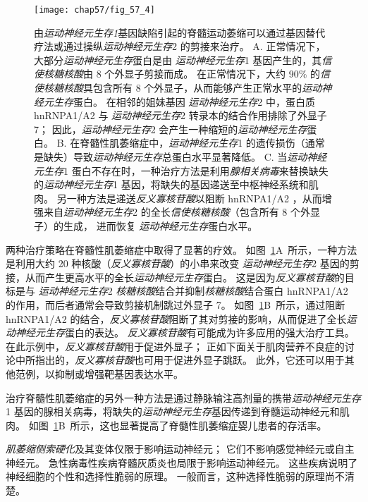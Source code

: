 \begin{figure}[htbp]
	\centering
	\texttt{[image: chap57/fig\_57\_4]}
	\caption{由\textit{运动神经元生存1}基因缺陷引起的脊髓运动萎缩可以通过基因替代疗法或通过操纵\textit{运动神经元生存}2 的剪接来治疗。
		A. 正常情况下，大部分\textit{运动神经元生存}蛋白是由 \textit{运动神经元生存}1 基因产生的，其\textit{信使核糖核酸}由 8 个外显子剪接而成。
		在正常情况下，大约 90\% 的\textit{信使核糖核酸}具包含所有 8 个外显子，从而能够产生正常水平的\textit{运动神经元生存}蛋白。
		在相邻的姐妹基因 \textit{运动神经元生存}2 中，蛋白质 hnRNPA1/A2 与 \textit{运动神经元生存}2 转录本的结合作用排除了外显子 7；
		因此，\textit{运动神经元生存}2 会产生一种缩短的\textit{运动神经元生存}蛋白。
		B. 在脊髓性肌萎缩症中，\textit{运动神经元生存}1 的遗传损伤（通常是缺失）导致\textit{运动神经元生存}总蛋白水平显著降低。
		C. 当\textit{运动神经元生存}1 蛋白不存在时，一种治疗方法是利用\textit{腺相关病毒}来替换缺失的\textit{运动神经元生存}1 基因，将缺失的基因递送至中枢神经系统和肌肉。
		另一种方法是递送\textit{反义寡核苷酸}以阻断 hnRNPA1/A2 ，从而增强来自\textit{运动神经元生存}2 的全长\textit{信使核糖核酸}（包含所有 8 个外显子）的生成，
		进而恢复 \textit{运动神经元生存}蛋白水平。}
	\label{fig:57_4}
\end{figure}


两种治疗策略在脊髓性肌萎缩症中取得了显著的疗效。
如图~\ref{fig:57_4}A~所示，一种方法是利用大约 20 种核酸（\textit{反义寡核苷酸}）的小串来改变 \textit{运动神经元生存}2 基因的剪接，从而产生更高水平的全长\textit{运动神经元生存}蛋白。
这是因为\textit{反义寡核苷酸}的目标是与 \textit{运动神经元生存}2 \textit{核糖核酸}结合并抑制\textit{核糖核酸}结合蛋白 hnRNPA1/A2 的作用，而后者通常会导致剪接机制跳过外显子 7。
如图~\ref{fig:57_4}B~所示，通过阻断 hnRNPA1/A2 的结合，\textit{反义寡核苷酸}阻断了其对剪接的影响，从而促进了全长\textit{运动神经元生存}蛋白的表达。
\textit{反义寡核苷酸}有可能成为许多应用的强大治疗工具。
在此示例中，\textit{反义寡核苷酸}用于促进外显子；
正如下面关于肌肉营养不良症的讨论中所指出的，\textit{反义寡核苷酸}也可用于促进外显子跳跃。
此外，它还可以用于其他范例，以抑制或增强靶基因表达水平。


治疗脊髓性肌萎缩症的另外一种方法是通过静脉输注高剂量的携带\textit{运动神经元生存}1 基因的腺相关病毒，将缺失的\textit{运动神经元生存}基因传递到脊髓运动神经元和肌肉。
如图~\ref{fig:57_4}B~所示，这也显著提高了脊髓性肌萎缩症婴儿患者的存活率。


\textit{肌萎缩侧索硬化}及其变体仅限于影响运动神经元；
它们不影响感觉神经元或自主神经元。
急性病毒性疾病脊髓灰质炎也局限于影响运动神经元。
这些疾病说明了神经细胞的个性和选择性脆弱的原理。
一般而言，这种选择性脆弱的原理尚不清楚。



